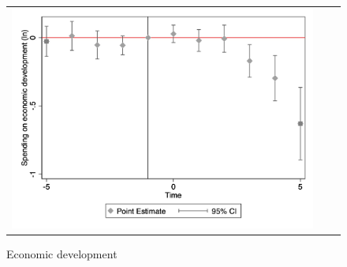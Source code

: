 \begin{figure}[!ht]
\begin{tabular}{@{}ccc@{}}
\begin{minipage}[t]{0.32\textwidth}
            \caption{Economic development}
            \includegraphics[width=\linewidth]{images/total population/caseventdd_ln_q4_11_step1.jpg}
            \label{fig:casecodev}
        \end{minipage} \\[10pt]


\end{tabular}
\end{figure}
